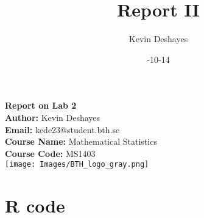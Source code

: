 \documentclass{report}
\title{Report II}
\author{Kevin Deshayes}
\date{\2024-10-14}
\begin{document}
\begin{titlepage}
    \centering
    {\huge\bfseries Report on Lab 2 \\[1cm]}  %
    \textbf{Author:} Kevin Deshayes\\[0.5cm]  %
    \textbf{Email:} kede23@student.bth.se\\[0.5cm]  %
    \textbf{Course Name:} Mathematical Statistics \\[0.5cm]  %
    \textbf{Course Code:} MS1403\\[1.5cm]  %

    \texttt{[image: Images/BTH\_logo\_gray.png]} %
    \vfill
    \vspace{2cm}
\end{titlepage}

\tableofcontents
\newpage
\section{R code}
\end{document}
